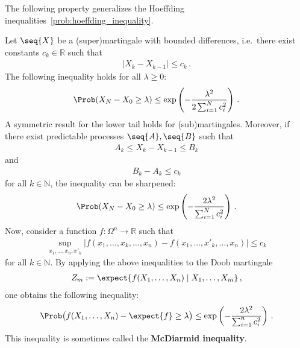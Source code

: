     The following property generalizes the Hoeffding inequalities~\cref{prob:hoeffding_inequality}.
    \begin{property}\label{prob:hoeffding_azuma}
        Let $\seq{X}$ be a (super)martingale with bounded differences, i.e.~there exist constants $c_k\in\mathbb{R}$ such that
        \begin{gather}
            |X_k-X_{k-1}|\leq c_k\,.
        \end{gather}
        The following inequality holds for all $\lambda\geq0$:
        \begin{gather}
            \Prob(X_N-X_0\geq\lambda)\leq\exp\left(-\frac{\lambda^2}{2\sum_{i=1}^Nc_i^2}\right)\,.
        \end{gather}
        A symmetric result for the lower tail holds for (sub)martingales. Moreover, if there exist predictable processes $\seq{A},\seq{B}$ such that
        \begin{gather}
            A_k\leq X_k-X_{k-1}\leq B_k
        \end{gather}
        and
        \begin{gather}
            B_k-A_k\leq c_k
        \end{gather}
        for all $k\in\mathbb{N}$, the inequality can be sharpened:
        \begin{gather}
            \Prob(X_N-X_0\geq\lambda)\leq\exp\left(-\frac{2\lambda^2}{\sum_{i=1}^Nc_i^2}\right)\,.
        \end{gather}
        Now, consider a function $f:\Omega^n\rightarrow\mathbb{R}$ such that
        \begin{gather}
            \sup_{x_1,\ldots,x_n,x'_k}|f(x_1,\ldots,x_k,\ldots,x_n)-f(x_1,\ldots,x'_k,\ldots,x_n)|\leq c_k
        \end{gather}
        for all $k\in\mathbb{N}$. By applying the above inequalities to the Doob martingale
        \begin{gather}
            Z_m:=\expect{f(X_1,\ldots,X_n)\mid X_1,\ldots,X_m}\,,
        \end{gather}
        one obtains the following inequality:
        \begin{gather}
            \Prob\bigl(f(X_1,\ldots,X_n)-\expect{f}\geq\lambda\bigr)\leq\exp\left(-\frac{2\lambda^2}{\sum_{i=1}^nc_i^2}\right)\,.
        \end{gather}
        This inequality is sometimes called the \textbf{McDiarmid inequality}.
    \end{property}

